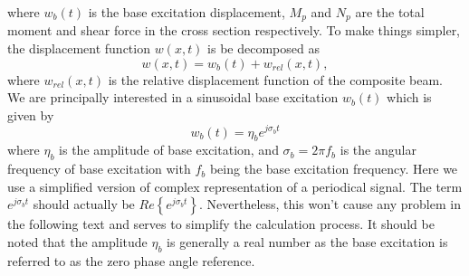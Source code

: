 \documentclass{svjour3}                     %
\begin{document}
where $w_b(t)$ is the base excitation displacement, $M_p$ and $N_p$ are the total moment and shear force in the cross section respectively. To make things simpler, the displacement function $w(x,t)$ is be decomposed as 
\begin{equation}
    w(x,t) = w_b(t) + w_{rel}(x,t),
\end{equation}
where $w_{rel}(x,t)$ is the relative displacement function of the composite beam. We are principally interested in a sinusoidal base excitation $w_b(t)$ which is given by
\begin{equation}
    w_b(t) = \eta_b e^{j \sigma_b t}
\end{equation}
where $\eta_b$ is the amplitude of base excitation, and $\sigma_b = 2 \pi f_b$ is the angular frequency of base excitation with $f_b$ being the base excitation frequency. Here we use a simplified version of complex representation of a periodical signal. The term $e^{j \sigma_b t}$ should actually be $Re\left\{e^{j \sigma_b t}\right\}$. Nevertheless, this won't cause any problem in the following text and serves to simplify the calculation process. It should be noted that the amplitude $\eta_b$ is generally a real number as the base excitation is referred to as the zero phase angle reference.
\end{document}
